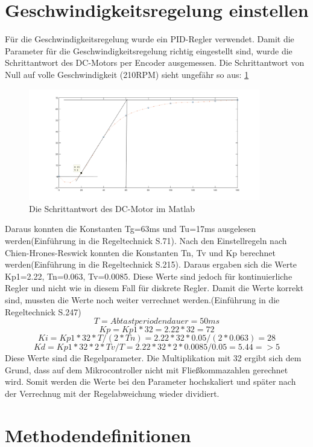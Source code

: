 \documentclass[a4paper, 10pt, fleqn]{article}
\begin{document}
\section{Geschwindigkeitsregelung einstellen}
Für die Geschwindigkeitsregelung wurde ein PID-Regler verwendet. Damit die Parameter für die Geschwindigkeitsregelung richtig eingestellt sind, wurde die Schrittantwort des DC-Motors per Encoder ausgemessen. Die Schrittantwort von Null auf volle Geschwindigkeit (210RPM) sieht ungefähr so aus:
\ref{fig:schrittantwort}
\begin{figure}[H]%
\centering
\includegraphics[width=0.9\textwidth]{Images/Sprungantwort.png}
\caption{Die Schrittantwort des DC-Motor im Matlab}
\label{fig:schrittantwort}
\end{figure}
Daraus konnten die Konstanten Tg=63ms und Tu=17ms ausgelesen werden(Einführung in die Regeltechnick S.71). Nach den Einstellregeln nach Chien-Hrones-Reswick konnten die Konstanten Tn, Tv und Kp berechnet werden(Einführung in die Regeltechnick S.215). Daraus ergaben sich die Werte Kp1=2.22, Tn=0.063, Tv=0.0085.
Diese Werte sind jedoch für kontinuierliche Regler und nicht wie in diesem Fall für diskrete Regler. Damit die Werte korrekt sind, mussten die Werte noch weiter verrechnet werden.(Einführung in die Regeltechnick S.247)
\[ T=Abtastperiodendauer=50ms\]
\[ Kp=Kp1*32=2.22*32=72\]
\[ Ki=Kp1*32*T/(2*Tn)=2.22*32*0.05/(2*0.063)=28\]
\[ Kd=Kp1*32*2*Tv/T=2.22*32*2*0.0085/0.05=5.44 =>5\]
Diese Werte sind die Regelparameter. Die Multiplikation mit 32 ergibt sich dem Grund, dass auf dem Mikrocontroller nicht mit Fließkommazahlen gerechnet wird. Somit werden die Werte bei den Parameter hochskaliert und später nach der Verrechnug mit der Regelabweichung wieder dividiert. 

\section{Methodendefinitionen}
\end{document}
